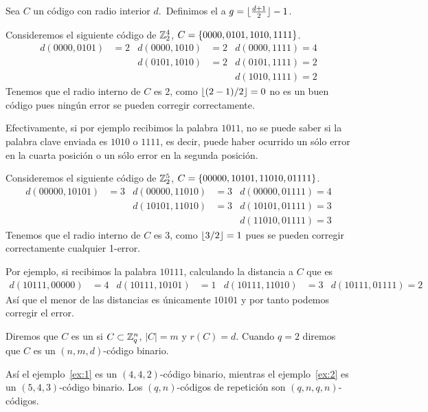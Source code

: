 \begin{definition}
	Sea $C$ un código con radio interior $d$.\ Definimos el  a $g=\lfloor \frac{d+1}{2} \rfloor-1$.
\end{definition}


\begin{example}
	\label{ex:1}
	Consideremos el siguiente código de $\mathbb{Z}_2^4$, $C=\left\{0000, 0101, 1010, 1111\right\}$.
	\begin{align*}
		d(0000, 0101) &= 2 & d(0000, 1010) &= 2 & d(0000, 1111) = 4 \\
		& & d(0101, 1010) &= 2 & d(0101, 1111) = 2 \\
		& & & & d(1010, 1111) = 2
	\end{align*}
	Tenemos que el radio interno de $C$ es $2$, como $\lfloor (2-1)/2 \rfloor=0$ no es un buen código pues ningún error se pueden corregir correctamente.

	Efectivamente, si por ejemplo recibimos la palabra $1011$, no se puede saber si la palabra clave enviada es $1010$ o $1111$, es decir, puede haber ocurrido un sólo error en la cuarta posición o un sólo error en la segunda posición.
\end{example}

\begin{example}
	\label{ex:2}
	Consideremos el siguiente código de $\mathbb{Z}_2^5$, $C=\left\{00000, 10101, 11010, 01111\right\}$.
	\begin{align*}
		d(00000, 10101) &= 3 & d(00000, 11010) &= 3 & d(00000, 01111) = 4 \\
		& & d(10101, 11010) &= 3 & d(10101, 01111) = 3 \\
		& & & & d(11010, 01111) = 3
	\end{align*}
	Tenemos que el radio interno de $C$ es $3$, como $\lfloor 3/2 \rfloor=1$ pues se pueden corregir correctamente cualquier 1-error.

	Por ejemplo, si recibimos la palabra $10111$, calculando la distancia a $C$ que es
	\begin{align*}
		d(10111, 00000) &= 4 & d(10111, 10101) &= 1 & d(10111, 11010) &= 3 & d(10111, 01111) = 2
	\end{align*}
	Así que el menor de las distancias es únicamente $10101$ y por tanto podemos corregir el error.
\end{example}

\begin{definition}
	Diremos que $C$ es un  si $C\subset\mathbb{Z}_q^n$, $|C| = m$ y $r(C)=d$.
	Cuando $q=2$ diremos que $C$ es un $(n, m, d)$-código binario.
\end{definition}

Así el ejemplo~\ref{ex:1} es un $(4, 4, 2)$-código binario, mientras el ejemplo~\ref{ex:2} es un $(5, 4, 3)$-código binario.
Los $(q, n)$-códigos de repetición son $(q, n, q, n)$-códigos.